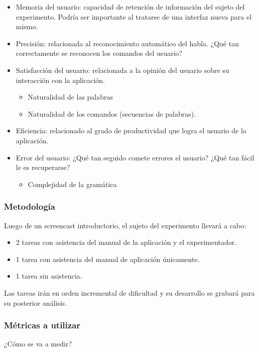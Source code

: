 \begin{itemize}
    \item Memoria del usuario: capacidad de retenci\'on de informaci\'on del sujeto del experimento. Podr\'ia ser importante al tratarse de una interfaz nueva para el mismo. 
    \item Precisi\'on: relacionada al reconocimiento autom\'atico del habla. ¿Qu\'e tan correctamente se reconocen los comandos del usuario?
    \item Satisfacci\'on del usuario: relacionada a la opini\'on del usuario sobre su interacci\'on con la aplicaci\'on.
    \begin{itemize}
        \item Naturalidad de las palabras
        \item Naturalidad de los comandos (secuencias de palabras).
    \end{itemize}
    \item Eficiencia: relacionado al grado de productividad que logra el usuario de la aplicaci\'on.
    \item Error del usuario: ¿Qu\'e tan seguido comete errores el usuario? ¿Qu\'e tan f\'acil le es recuperarse?
    \begin{itemize}
        \item Complejidad de la gram\'atica
    \end{itemize}
\end{itemize}

\subsubsection{Metodolog\'ia}
Luego de un screencast introductorio, el sujeto del experimento llevar\'a a cabo:

\begin{itemize}
    \item 2 tareas con asistencia del manual de la aplicaci\'on y el experimentador.
    \item 1 tarea con asistencia del manual de aplicaci\'on \'unicamente.
    \item 1 tarea sin asistencia.
\end{itemize}
Las tareas ir\'an en orden incremental de dificultad y su desarrollo se grabar\'a para su posterior an\'alisis.

\subsubsection{M\'etricas a utilizar}
¿C\'omo se va a medir?

